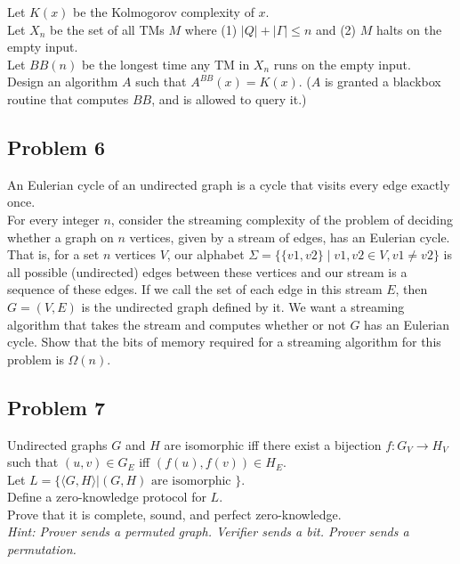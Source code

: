 \documentclass[11pt]{article}
\begin{document}
Let $K(x)$ be the Kolmogorov complexity of $x$.\\
Let $X_n$ be the set of all TMs $M$ where (1) $|Q| + |\Gamma| \leq n$ and
(2) $M$ halts on the empty input.\\
Let $BB(n)$ be the longest time any TM in $X_n$ runs on the empty input.\\

\noindent Design an algorithm $A$ such that $A^{BB}(x) = K(x)$. ($A$ is granted a blackbox routine
that computes $BB$, and is allowed to query it.)

\newpage
\subsection*{Problem 6}

An Eulerian cycle of an undirected graph is a cycle that visits every edge exactly once.\\

\noindent For every integer $n$, consider the streaming complexity of the problem of deciding whether a graph
on $n$ vertices, given by a stream of edges, has an Eulerian cycle.\\

\noindent That is, for a set $n$ vertices $V$, our alphabet $\Sigma = \{\{v1, v2\} \mid v1, v2 \in V, v1 \neq v2\}$ is all possible
(undirected) edges between these vertices and our stream is a sequence of these edges. If we call
the set of each edge in this stream $E$, then $G = (V, E)$ is the undirected graph defined by it. We
want a streaming algorithm that takes the stream and computes whether or not $G$ has an Eulerian cycle.
Show that the bits of memory required for a streaming algorithm for this problem is $\Omega(n)$.

\newpage
\subsection*{Problem 7}

Undirected graphs $G$ and $H$ are isomorphic iff there exist a bijection $f : G_V \rightarrow H_V$
such that $(u,v) \in G_E$ iff $(f(u), f(v)) \in H_E$.\\

\noindent Let $L = \{\langle G, H \rangle | (G, H) \mbox{ are isomorphic } \}$.\\

\noindent Define a zero-knowledge protocol for $L$.\\

\noindent Prove that it is complete, sound, and perfect zero-knowledge.\\

\noindent \emph{Hint: Prover sends a permuted graph. Verifier sends a bit. Prover sends a permutation.}
\end{document}

